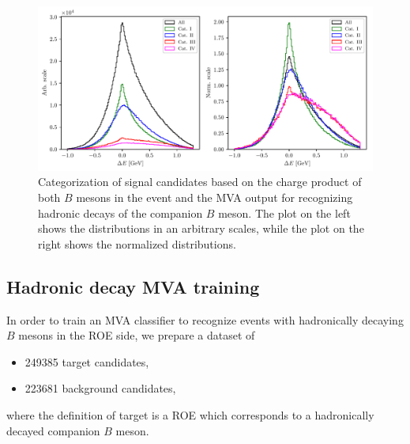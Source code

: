 \documentclass[headings=standardclasses,headings=big,oneside,a4paper,openany,12pt]{scrbook}
\begin{document}
\begin{figure}[H]
\centering
\captionsetup{width=0.8\linewidth}
\includegraphics[width=\linewidth]{fig/sig_categ}
\caption{Categorization of signal candidates based on the charge product of both $B$ mesons in the event and the MVA output for recognizing hadronic decays of the companion $B$ meson. The plot on the left shows the distributions in an arbitrary scales, while the plot on the right shows the normalized distributions.}
\label{fig:sig_categ}
\end{figure}


\subsection{Hadronic decay MVA training}
\label{subs:HDMVA}

In order to train an MVA classifier to recognize events with hadronically decaying $B$ mesons in the ROE side, we prepare a dataset of
\begin{itemize}
\item 249385 target candidates,
\item 223681 background candidates,
\end{itemize}
where the definition of target is a ROE which corresponds to a hadronically decayed companion $B$ meson. 
\end{document}
